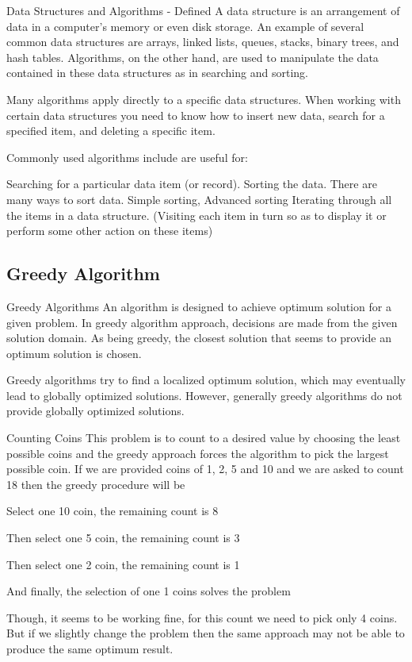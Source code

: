 Data Structures and Algorithms - Defined
A data structure is an arrangement of data in a computer's memory or even disk storage. An example of several common data structures are arrays, linked lists, queues, stacks, binary trees, and hash tables. Algorithms, on the other hand, are used to manipulate the data contained in these data structures as in searching and sorting.

Many algorithms apply directly to a specific data structures. When working with certain data structures you need to know how to insert new data, search for a specified item, and deleting a specific item.

Commonly used algorithms include are useful for:

Searching for a particular data item (or record).
Sorting the data. There are many ways to sort data. Simple sorting, Advanced sorting
Iterating through all the items in a data structure. (Visiting each item in turn so as to display it or perform some other action on these items)

\subsection{Greedy Algorithm}

Greedy Algorithms
An algorithm is designed to achieve optimum solution for a given problem. In greedy algorithm approach, decisions are made from the given solution domain. As being greedy, the closest solution that seems to provide an optimum solution is chosen.

Greedy algorithms try to find a localized optimum solution, which may eventually lead to globally optimized solutions. However, generally greedy algorithms do not provide globally optimized solutions.

Counting Coins
This problem is to count to a desired value by choosing the least possible coins and the greedy approach forces the algorithm to pick the largest possible coin. If we are provided coins of 1, 2, 5 and 10 and we are asked to count 18 then the greedy procedure will be

Select one 10 coin, the remaining count is 8

Then select one 5 coin, the remaining count is 3

Then select one 2 coin, the remaining count is 1

And finally, the selection of one 1 coins solves the problem

Though, it seems to be working fine, for this count we need to pick only 4 coins. But if we slightly change the problem then the same approach may not be able to produce the same optimum result.

